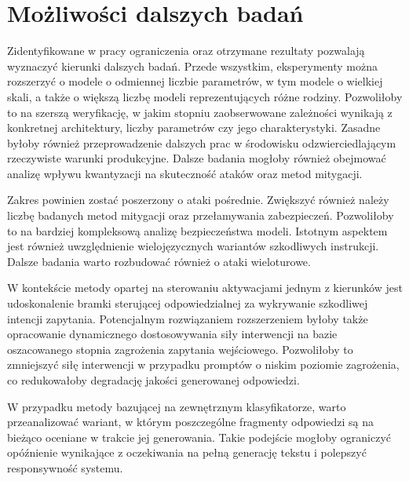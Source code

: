 \section{Możliwości dalszych badań}

Zidentyfikowane w pracy ograniczenia oraz otrzymane rezultaty pozwalają wyznaczyć kierunki dalszych badań. Przede wszystkim, eksperymenty można rozszerzyć o modele o odmiennej liczbie parametrów, w tym modele o wielkiej skali, a także o większą liczbę modeli reprezentujących różne rodziny. Pozwoliłoby to na szerszą weryfikację, w jakim stopniu zaobserwowane zależności wynikają z konkretnej architektury, liczby parametrów czy jego charakterystyki. Zasadne byłoby również przeprowadzenie dalszych prac w środowisku odzwierciedlającym rzeczywiste warunki produkcyjne.
Dalsze badania mogłoby również obejmować analizę wpływu kwantyzacji na skuteczność ataków oraz metod mitygacji.

Zakres powinien zostać poszerzony o ataki pośrednie. Zwiększyć również należy liczbę badanych metod mitygacji oraz przełamywania zabezpieczeń. Pozwoliłoby to na bardziej kompleksową analizę bezpieczeństwa modeli. Istotnym aspektem jest również uwzględnienie wielojęzycznych wariantów szkodliwych instrukcji. Dalsze badania warto rozbudować również o ataki wieloturowe.

W kontekście metody opartej na sterowaniu aktywacjami jednym z kierunków jest udoskonalenie bramki sterującej odpowiedzialnej za wykrywanie szkodliwej intencji zapytania. Potencjalnym rozwiązaniem rozszerzeniem byłoby także opracowanie dynamicznego dostosowywania siły interwencji na bazie oszacowanego stopnia zagrożenia zapytania wejściowego. Pozwoliłoby to zmniejszyć siłę interwencji w przypadku promptów o niskim poziomie zagrożenia, co redukowałoby degradację jakości generowanej odpowiedzi.

W przypadku metody bazującej na zewnętrznym klasyfikatorze, warto przeanalizować wariant, w którym poszczególne fragmenty odpowiedzi są na bieżąco oceniane w trakcie jej generowania. Takie podejście mogłoby ograniczyć opóźnienie wynikające z oczekiwania na pełną generację tekstu i polepszyć responsywność systemu.